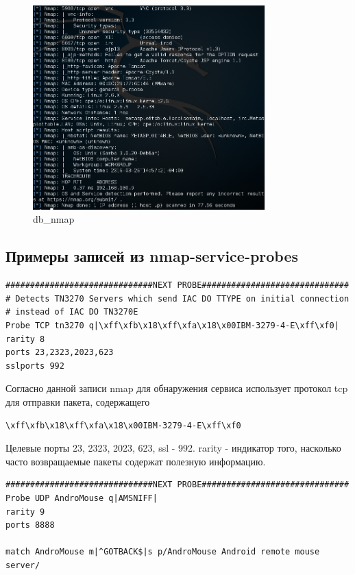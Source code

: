 \documentclass[10pt,a4paper]{report}
\begin{document}
\begin{figure}[h]
	\begin{center}
		\includegraphics[width=0.8\textwidth]{Img/12}
		\caption{db\_nmap}
		\label{Img:12}
	\end{center}
\end{figure}

\subsection{Примеры записей из nmap-service-probes}
\label{probes_example}

\begin{verbatim}
##############################NEXT PROBE##############################
# Detects TN3270 Servers which send IAC DO TTYPE on initial connection
# instead of IAC DO TN3270E
Probe TCP tn3270 q|\xff\xfb\x18\xff\xfa\x18\x00IBM-3279-4-E\xff\xf0|
rarity 8
ports 23,2323,2023,623
sslports 992
\end{verbatim}

Согласно данной записи nmap для обнаружения сервиса использует протокол tcp для отправки пакета, содержащего \begin{verbatim}\xff\xfb\x18\xff\xfa\x18\x00IBM-3279-4-E\xff\xf0\end{verbatim}
Целевые порты 23, 2323, 2023, 623, ssl - 992. rarity - индикатор того, насколько часто возвращаемые пакеты содержат полезную информацию.

\begin{verbatim}
##############################NEXT PROBE##############################
Probe UDP AndroMouse q|AMSNIFF|
rarity 9
ports 8888

match AndroMouse m|^GOTBACK$|s p/AndroMouse Android remote mouse server/
\end{verbatim}
\end{document}
